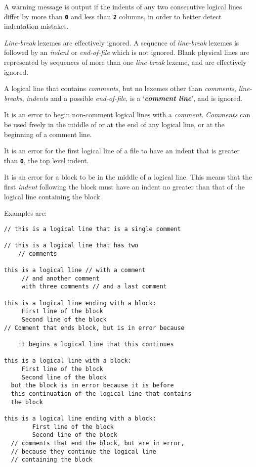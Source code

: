 \documentclass[12pt]{article}
\newcommand{\TT}[1]{{\tt \bfseries #1}}
\newcommand{\key}[1]{{\bf \em #1}\index{#1}}
\newenvironment{indpar}[1][0.3in]%
	{\begin{list}{}%
		     {\setlength{\itemsep}{0in}%
		      \setlength{\topsep}{0in}%
		      \setlength{\parsep}{1ex}%
		      \setlength{\labelwidth}{#1}%
		      \setlength{\leftmargin}{#1}%
		      \addtolength{\leftmargin}{\labelsep}}%
	 \item}%
	{\end{list}}
\begin{document}
A warning message is output if the indents of any two
consecutive logical lines differ by more than \TT{0} and
less than \TT{2} columns, in order to better detect
indentation mistakes.

{\em Line-break} lexemes are effectively ignored.  A sequence
of {\em line-break} lexemes is followed by an {\em indent}
or {\em end-of-file} which is not ignored.
Blank physical lines are represented by sequences of
more than one {\em line-break} lexeme, and are effectively
ignored.

A logical line that contains {\em comments}, but no
lexemes other than {\em comments}, {\em line-breaks}, {\em indents}
and a possible {\em end-of-file}, is
a `\key{comment line}', and is ignored.

It is an error to begin non-comment logical lines with
a {\em comment}.
{\em Comments} can be used freely in the middle of or at the
end of any logical line, or at the beginning of a comment line.

It is an error for the first logical line of a file
to have an indent that is greater than \TT{0}, the top level
indent.

It is an error for a block to be in the middle of a logical
line.  This means that the first {\em indent} following the
block must have an indent no greater than that of the logical
line containing the block.

Examples are:
\begin{indpar}\begin{verbatim}
// this is a logical line that is a single comment

// this is a logical line that has two
    // comments

this is a logical line // with a comment
     // and another comment
     with three comments // and a last comment

this is a logical line ending with a block:
     First line of the block
     Second line of the block
// Comment that ends block, but is in error because

    it begins a logical line that this continues

this is a logical line with a block:
     First line of the block
     Second line of the block
  but the block is in error because it is before
  this continuation of the logical line that contains
  the block

this is a logical line ending with a block:
        First line of the block
        Second line of the block
  // comments that end the block, but are in error,
  // because they continue the logical line
  // containing the block
\end{verbatim}\end{indpar}
\end{document}
